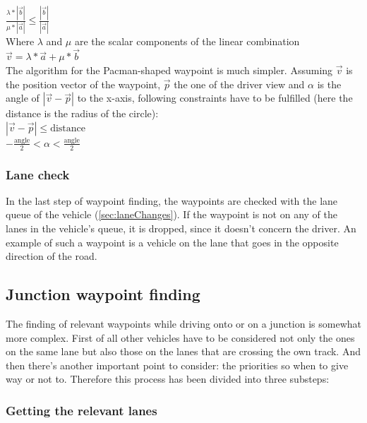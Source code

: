 $ \frac{\lambda * \left| \vec{b} \right| }{\mu * \left| \vec{a} \right|} \leq 
\frac{\left| \vec{b} \right|}{\left| \vec{a} \right|}$ \\

\noindent Where $\lambda$ and $\mu$ are the scalar components of the linear combination \\

$ \vec{v} = \lambda * \vec{a} + \mu * \vec{b} $ \\

The algorithm for the Pacman-shaped waypoint is much simpler. Assuming
$\vec{v}$ is the position vector of the waypoint, $\vec{p}$ the
one of the driver view and $\alpha$ is the angle of $\left | \vec{v} -
\vec{p}\right|$ to the x-axis, following constraints have to be fulfilled
(here the distance is the radius of the circle): \\

$ \left| \vec{v} - \vec{p} \right| \leq \text{distance}$  \\

$ -\frac{\text{angle}}{2} < \alpha < \frac{\text{angle}}{2} $


\subsubsection{Lane check}

In the last step of waypoint finding, the waypoints are checked with the
lane queue of the vehicle (\ref{sec:laneChanges}). If the waypoint is not
on any of the lanes in the vehicle's queue, it is dropped, since it doesn't
concern the driver. An example of such a waypoint is a vehicle on the lane
that goes in the opposite direction of the road.


\subsection{Junction waypoint finding}
\label{sec:junctionWPfinding}

The finding of relevant waypoints while driving onto or on a junction is somewhat more
 complex. First of all other vehicles have to be considered not only the ones on the same
lane but also those on the lanes that are crossing the own track. And then there's another
 important point to consider: the priorities so when to give way or not to. Therefore this
process has been divided into three substeps:

\subsubsection{Getting the relevant lanes}


